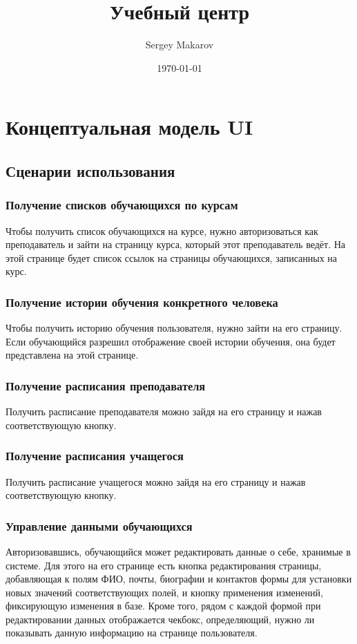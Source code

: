 \documentclass[11pt]{article}
\author{Sergey Makarov}
\date{\today}
\title{Учебный центр}
\begin{document}
\maketitle
\tableofcontents

\section{Концептуальная модель UI}
\label{sec:orgb12ca78}
\subsection{Сценарии использования}
\label{sec:org743279b}
\subsubsection{Получение списков обучающихся по курсам}
\label{sec:orgdacd7fb}
Чтобы получить список обучающихся на курсе, нужно авторизоваться как преподаватель и зайти
на страницу курса, который этот преподаватель ведёт. На этой странице будет список ссылок на
страницы обучающихся, записанных на курс.
\subsubsection{Получение истории обучения конкретного человека}
\label{sec:org18cc026}
Чтобы получить историю обучения пользователя, нужно зайти на его страницу. Если обучающийся
разрешил отображение своей истории обучения, она будет представлена на этой странице.
\subsubsection{Получение расписания преподавателя}
\label{sec:org1b64dbb}
Получить расписание преподавателя можно зайдя на его страницу и нажав соответствующую кнопку.
\subsubsection{Получение расписания учащегося}
\label{sec:orgd2d9f67}
Получить расписание учащегося можно зайдя на его страницу и нажав соответствующую кнопку.
\subsubsection{Управление данными обучающихся}
\label{sec:org8978d76}
Авторизовавшись, обучающийся может редактировать данные о себе, хранимые в системе. Для
этого на его странице есть кнопка редактирования страницы, добавляющая к полям ФИО, почты,
биографии и контактов формы для установки новых значений соответствующих полей, и кнопку
применения изменений, фиксирующую изменения в базе. Кроме того, рядом с каждой формой при
редактировании данных отображается чекбокс, определяющий, нужно ли показывать данную
информацию на странице пользователя.
\end{document}
